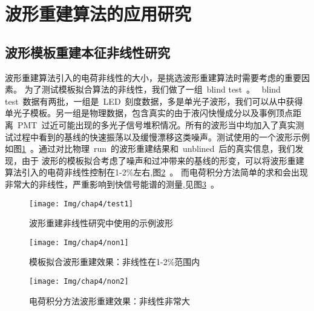 \section{波形重建算法的应用研究}
\subsection{波形模板重建本征非线性研究}
波形重建算法引入的电荷非线性的大小，是挑选波形重建算法时需要考虑的重要因素。
为了测试模板拟合算法的非线性，我们做了一组~blind test~。
~blind test~数据有两批，一组是~LED~刻度数据，多是单光子波形，我们可以从中获得单光子模板。另一组是物理数据，包含真实的由于液闪快慢成分以及事例顶点距离~PMT~过近可能出现的多光子信号堆积情况。所有的波形当中均加入了真实测试过程中看到的基线的快速振荡以及缓慢漂移这类噪声。测试使用的一个波形示例如图\ref{fig:test1}~。通过对比物理~run~的波形重建结果和~unblined~后的真实信息，我们发现，由于
波形的模板拟合考虑了噪声和过冲带来的基线的形变，可以将波形重建算法引入的电荷非线性控制在1-2\%左右,图\ref{fig:non1}~。 而电荷积分方法简单的求和会出现非常大的非线性，严重影响到快信号能谱的测量,见图\ref{fig:non2}~。
\begin{figure}[!htbp]
  \centering
   \texttt{[image: Img/chap4/test1]}
    \caption{波形重建非线性研究中使用的示例波形}
  \label{fig:test1}
\end{figure}
\begin{figure}[!htbp]
  \centering
   \texttt{[image: Img/chap4/non1]}
    \caption{模板拟合波形重建效果：非线性在1-2\%范围内}
  \label{fig:non1}
\end{figure}
\begin{figure}[!htbp]
  \centering
   \texttt{[image: Img/chap4/non2]}
    \caption{电荷积分方法波形重建效果：非线性非常大}
  \label{fig:non2}
\end{figure}
